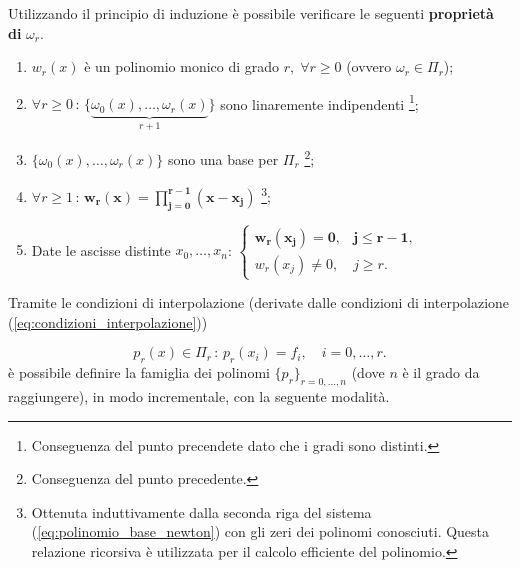 Utilizzando il principio di induzione è possibile verificare le seguenti \textbf{proprietà di} $\omega_r$.
\begin{property}
	\begin{enumerate}
	    \item $w_r(x)$ è un polinomio monico di grado $r,\; \forall r\geq 0$ (ovvero $\omega_r\in\Pi_r$);
	    \item $\forall r\geq 0 \, :\, \{\underbrace{\omega_0(x), \hdots, \omega_r(x)}_{r+1}\}$ sono linaremente indipendenti \footnote{Conseguenza del punto precendete dato che i gradi sono distinti.};
	    \item $\{\omega_0(x),\hdots,\omega_r(x)\}$ sono una base per $\Pi_r$ \footnote{Conseguenza del punto precedente.};
	    \item $\forall r \geq 1\,:\, \boldsymbol{w_r(x)=\prod_{j=0}^{r-1}(x-x_j)}$ \footnote{Ottenuta induttivamente dalla seconda riga del sistema (\ref{eq:polinomio_base_newton}) con gli zeri dei polinomi conosciuti. Questa relazione ricorsiva è utilizzata per il calcolo efficiente del polinomio.};
	    \item Date le ascisse distinte $x_0, \hdots, x_n$:
	        $\begin{cases}
	        \boldsymbol{w_r(x_j)=0}, & \boldsymbol{j\leq r-1},\\
	        w_r(x_j)\neq 0, & j\geq r.
	        \end{cases}$
	\end{enumerate}
\end{property}

Tramite le condizioni di interpolazione (derivate dalle condizioni di interpolazione (\ref{eq:condizioni_interpolazione}))

\begin{equation}\label{eq:condizioni_intepolazione_r}
    p_r(x)\in\Pi_r\, :\, p_r(x_i)=f_i,\quad i=0,\hdots, r.
\end{equation}
è possibile definire la famiglia dei polinomi $\{p_r\}_{r=0,\hdots,n}$ (dove $n$ è il grado da raggiungere), in modo incrementale, con la seguente modalità.

